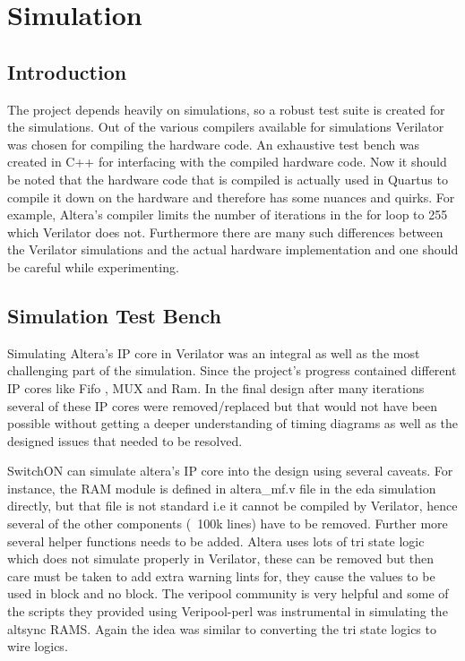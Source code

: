 \documentclass[twoside,12pt,fleqn]{book} %
\begin{document}
\chapter{Simulation}

\section{Introduction}
The project depends heavily on simulations, so a robust test suite is created for the simulations. Out of the various compilers available for simulations Verilator was chosen for compiling the hardware code. An exhaustive test bench was created in C++ for interfacing with the compiled hardware code. Now it should be noted that the hardware code that is compiled is actually used in Quartus to compile it down on the hardware and therefore has some nuances and quirks. For example, Altera's compiler limits the number of iterations in the for loop to 255 which Verilator does not. Furthermore there are many such differences between the Verilator simulations and the actual hardware implementation and one should be careful while experimenting.

\section{Simulation Test Bench} Simulating Altera's IP core in Verilator was an integral as well as the most challenging part of the simulation. Since the project's progress contained different IP cores like Fifo , MUX and Ram. In the final design after many iterations several of these IP cores were removed/replaced but that would not have been possible without getting a deeper understanding of timing diagrams as well as the designed issues that needed to be resolved. 
\par SwitchON can simulate altera's IP core into the design using several caveats. For instance, the RAM module is defined in altera\_mf.v file in the eda simulation directly, but that file is not standard i.e it cannot be compiled by Verilator, hence several of the other components (~100k lines) have to be removed. Further more several helper functions needs to be added. Altera uses lots of tri state logic which does not simulate properly in Verilator, these can be removed but then care must be taken to add extra warning lints for, they cause the values to be used in block and no block. The veripool community is very helpful and some of the scripts they provided using Veripool-perl was instrumental in simulating the altsync RAMS. Again the idea was similar to converting the tri state logics to wire logics.
\end{document}
